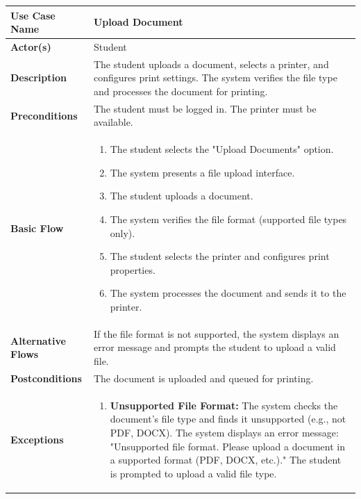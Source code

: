 \documentclass[a4paper]{report}
\begin{document}
\begin{enumerate}
    
        \begin{table}[h!]
            \centering
            \renewcommand{\arraystretch}{1.8}
            \begin{tabular}{|>{\centering\arraybackslash}m{3cm}|>{\raggedright\arraybackslash}m{10cm}|}
            \hline
            \textbf{Use Case Name} & Upload Document \\ \hline
            \textbf{Actor(s)} & Student \\ \hline
            \textbf{Description} & The student uploads a document, selects a printer, and configures print settings. The system verifies the file type and processes the document for printing. \\ \hline
            \textbf{Preconditions} & The student must be logged in. The printer must be available. \\ \hline
            \textbf{Basic Flow} & 
            \begin{enumerate}
                \item The student selects the "Upload Documents" option.
                \item The system presents a file upload interface.
                \item The student uploads a document.
                \item The system verifies the file format (supported file types only).
                \item The student selects the printer and configures print properties.
                \item The system processes the document and sends it to the printer.
            \end{enumerate} \\ [-2ex] \hline
            \textbf{Alternative Flows} & If the file format is not supported, the system displays an error message and prompts the student to upload a valid file. \\ \hline
            \textbf{Postconditions} & The document is uploaded and queued for printing. \\ \hline
            \textbf{Exceptions} & 
            \begin{enumerate}
                \item \textbf{Unsupported File Format:} The system checks the document's file type and finds it unsupported (e.g., not PDF, DOCX). The system displays an error message: "Unsupported file format. Please upload a document in a supported format (PDF, DOCX, etc.)." The student is prompted to upload a valid file type.

\end{enumerate}
\end{tabular}
\end{table}
\end{enumerate}
\end{document}
